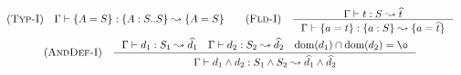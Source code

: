 \[\begin{array}{c}
    \RULE{Typ-I} \quad \TJ{\Gamma}{\DEF{A}{S}}{\TDEC{A}{S}{S}}{\DEF{A}{S}}
    \qquad

    \RULE{Fld-I} \quad \inference{
        \TJ{\Gamma}{t}{S}{\HAT{t}}
    }{
        \TJ{\Gamma}{\DEF{a}{t}}{\FDEC{a}{S}}{\DEF{a}{\HAT{t}}}
    } \\[4mm]

    \RULE{AndDef-I} \quad \inference{
        \TJ{\Gamma}{d_1}{S_1}{\HAT{d_1}} \quad
        \TJ{\Gamma}{d_2}{S_2}{\HAT{d_2}} \quad
        \DOM{d_1} \cap \DOM{d_2} = \o
    }{
        \TJ{\Gamma}{\AGG{d_1}{d_2}}{\AGG{S_1}{S_2}}{\AGG{\HAT{d_1}}{\HAT{d_2}}}
    }
\end{array}\]
